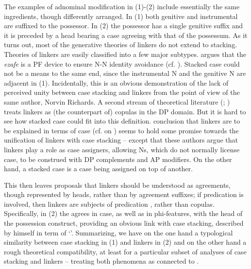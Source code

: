 \documentclass[output=paper]{langsci/langscibook}
\begin{document}
The examples of adnominal modification in (1)-(2) include essentially the same ingredients, though differently arranged. In (1) both genitive and instrumental are suffixed to the possessor. In (2) the possessor has a single genitive suffix and it is preceded by a head bearing a case agreeing with that of the possessum. As it turns out, most of the generative theories of linkers do not extend to stacking. Theories of linkers are easily classified into a few major subtypes. \citet{Richards2010} argues that the  \textit{ezafe} is a PF device to ensure N-N identity avoidance (cf. \citealt{Ghomeshi1997}). Stacked case could not be a means to the same end, since the instrumental N and the genitive N are adjacent in (1). Incidentally, this is an obvious demonstration of the lack of perceived unity between case stacking and linkers from the point of view of the same author, Norvin Richards. A second stream of theoretical literature (\citealt{Dikken2004}; \citealt{Campos2005}) treats linkers as (the counterpart of) copulas in the DP domain. But it is hard to see how stacked case could fit into this definition.  conclusion that linkers are to be explained in terms of case (cf. \citealt{Samiian1994} on ) seems to hold some promise towards the unification of linkers with case stacking – except that these authors argue that linkers play a role as case assigners, allowing Ns, which do not normally license case, to be construed with DP complements and AP modifiers. On the other hand, a stacked case is a case being assigned on top of another. 

This then leaves proposals \citep{Philip2012} that linkers should be understood as agreements, though represented by heads, rather than by agreement suffixes; if predication is involved, then linkers are subjects of predication \citep{Franco2015}, rather than copulas. Specifically, in  (2) the  agrees in case, as well as in phi-features, with the head of the possession construct, providing an obvious link with case stacking, described by \citet{Richards2013} himself in term of ‘’. Summarizing, we have on the one hand a typological similarity between case stacking in (1) and linkers in (2) and on the other hand a rough theoretical compatibility, at least for a particular subset of analyses of case stacking and linkers – treating both phenomena as connected to . 
\end{document}
